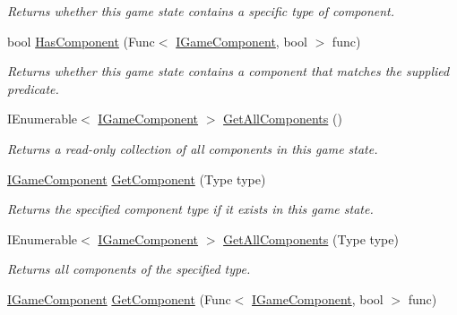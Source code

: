 \begin{DoxyCompactItemize}
\begin{DoxyCompactList}\small\item\em Returns whether this game state contains a specific type of component. \end{DoxyCompactList}\item 
bool \hyperlink{interface_tri_devs_1_1_tri_engine2_d_1_1_state_management_1_1_i_game_state_a9b310842375484cdde4a7d265c8fc70e}{Has\-Component} (Func$<$ \hyperlink{interface_tri_devs_1_1_tri_engine2_d_1_1_interfaces_1_1_i_game_component}{I\-Game\-Component}, bool $>$ func)
\begin{DoxyCompactList}\small\item\em Returns whether this game state contains a component that matches the supplied predicate. \end{DoxyCompactList}\item 
I\-Enumerable$<$ \hyperlink{interface_tri_devs_1_1_tri_engine2_d_1_1_interfaces_1_1_i_game_component}{I\-Game\-Component} $>$ \hyperlink{interface_tri_devs_1_1_tri_engine2_d_1_1_state_management_1_1_i_game_state_a975ccc52400bf798ee4202f14b6f40af}{Get\-All\-Components} ()
\begin{DoxyCompactList}\small\item\em Returns a read-\/only collection of all components in this game state. \end{DoxyCompactList}\item 
\hyperlink{interface_tri_devs_1_1_tri_engine2_d_1_1_interfaces_1_1_i_game_component}{I\-Game\-Component} \hyperlink{interface_tri_devs_1_1_tri_engine2_d_1_1_state_management_1_1_i_game_state_a54f210dff9b85848e5944b3eb07942a8}{Get\-Component} (Type type)
\begin{DoxyCompactList}\small\item\em Returns the specified component type if it exists in this game state. \end{DoxyCompactList}\item 
I\-Enumerable$<$ \hyperlink{interface_tri_devs_1_1_tri_engine2_d_1_1_interfaces_1_1_i_game_component}{I\-Game\-Component} $>$ \hyperlink{interface_tri_devs_1_1_tri_engine2_d_1_1_state_management_1_1_i_game_state_ac4acbe5b7173efd6757c56df4c84c78e}{Get\-All\-Components} (Type type)
\begin{DoxyCompactList}\small\item\em Returns all components of the specified type. \end{DoxyCompactList}\item 
\hyperlink{interface_tri_devs_1_1_tri_engine2_d_1_1_interfaces_1_1_i_game_component}{I\-Game\-Component} \hyperlink{interface_tri_devs_1_1_tri_engine2_d_1_1_state_management_1_1_i_game_state_a57a0ec23b01e9d0101a1514074d4c890}{Get\-Component} (Func$<$ \hyperlink{interface_tri_devs_1_1_tri_engine2_d_1_1_interfaces_1_1_i_game_component}{I\-Game\-Component}, bool $>$ func)

\end{DoxyCompactItemize}
